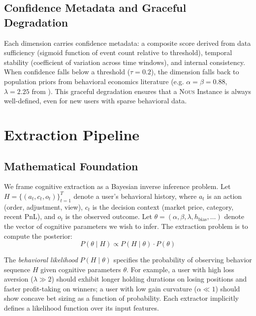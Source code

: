\documentclass[11pt]{article}
\newcommand{\nous}{\textsc{Nous}}
\newcommand{\eg}{e.g.}
\begin{document}
\subsection{Confidence Metadata and Graceful Degradation}

Each dimension carries confidence metadata: a composite score derived from data sufficiency (sigmoid function of event count relative to threshold), temporal stability (coefficient of variation across time windows), and internal consistency. When confidence falls below a threshold ($\tau = 0.2$), the dimension falls back to population priors from behavioral economics literature (\eg{} $\alpha = \beta = 0.88$, $\lambda = 2.25$ from \citealt{kahneman1979prospect}). This graceful degradation ensures that a \nous{} Instance is always well-defined, even for new users with sparse behavioral data.


\section{Extraction Pipeline}
\label{sec:extraction}

\subsection{Mathematical Foundation}
\label{sec:extraction:math}

We frame cognitive extraction as a Bayesian inverse inference problem. Let $H = \{(a_t, c_t, o_t)\}_{t=1}^T$ denote a user's behavioral history, where $a_t$ is an action (order, adjustment, view), $c_t$ is the decision context (market price, category, recent PnL), and $o_t$ is the observed outcome. Let $\theta = (\alpha, \beta, \lambda, h_{\text{bias}}, \ldots)$ denote the vector of cognitive parameters we wish to infer. The extraction problem is to compute the posterior:
\begin{equation}
    P(\theta \mid H) \propto P(H \mid \theta) \cdot P(\theta)
    \label{eq:bayes}
\end{equation}

The \emph{behavioral likelihood} $P(H \mid \theta)$ specifies the probability of observing behavior sequence $H$ given cognitive parameters $\theta$. For example, a user with high loss aversion ($\lambda \gg 2$) should exhibit longer holding durations on losing positions and faster profit-taking on winners; a user with low gain curvature ($\alpha \ll 1$) should show concave bet sizing as a function of probability. Each extractor implicitly defines a likelihood function over its input features.
\end{document}
